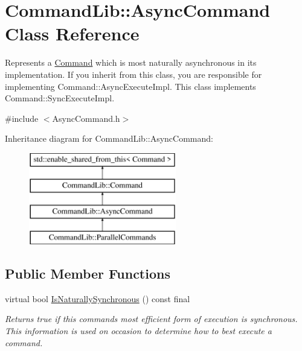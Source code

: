 \hypertarget{class_command_lib_1_1_async_command}{}\section{Command\+Lib\+:\+:Async\+Command Class Reference}
\label{class_command_lib_1_1_async_command}


Represents a \mbox{\hyperlink{class_command_lib_1_1_command}{Command}} which is most naturally asynchronous in its implementation. If you inherit from this class, you are responsible for implementing Command\+::\+Async\+Execute\+Impl. This class implements Command\+::\+Sync\+Execute\+Impl.  




{\ttfamily \#include $<$Async\+Command.\+h$>$}

Inheritance diagram for Command\+Lib\+:\+:Async\+Command\+:\begin{figure}[H]
\begin{center}
\leavevmode
\includegraphics[height=4.000000cm]{class_command_lib_1_1_async_command}
\end{center}
\end{figure}
\subsection*{Public Member Functions}
\begin{DoxyCompactItemize}
\item 
\mbox{\label{class_command_lib_1_1_async_command_a2c08165637770cc7bb8fdd814a93acec}} 
virtual bool \mbox{\hyperlink{class_command_lib_1_1_async_command_a2c08165637770cc7bb8fdd814a93acec}{Is\+Naturally\+Synchronous}} () const final
\begin{DoxyCompactList}\small\item\em Returns true if this command\textquotesingle{}s most efficient form of execution is synchronous. This information is used on occasion to determine how to best execute a command.  \end{DoxyCompactList}\end{DoxyCompactItemize}
